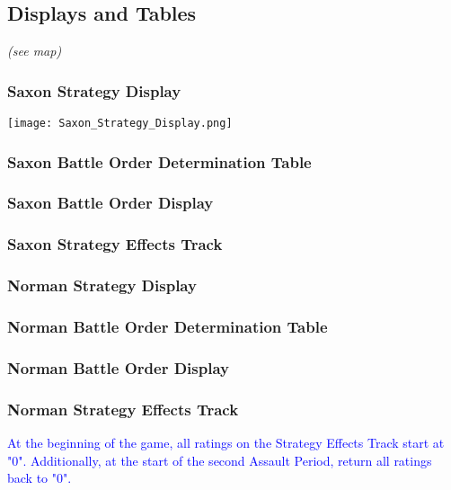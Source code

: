 \subsection{Displays and Tables} \textit{(see map)}

\subsubsection{Saxon Strategy Display}

\begin{center}
  \texttt{[image: Saxon\_Strategy\_Display.png]}
\end{center}

\subsubsection{Saxon Battle Order Determination Table}

\subsubsection{Saxon Battle Order Display}

\subsubsection{Saxon Strategy Effects Track}

\subsubsection{Norman Strategy Display}

\subsubsection{Norman Battle Order Determination Table}

\subsubsection{Norman Battle Order Display}

\subsubsection{Norman Strategy Effects Track}
\hfill

\textcolor{blue}{At the beginning of the game, all ratings on the Strategy Effects Track start at "0". Additionally, at the start of the second Assault Period, return all ratings back to "0".}
